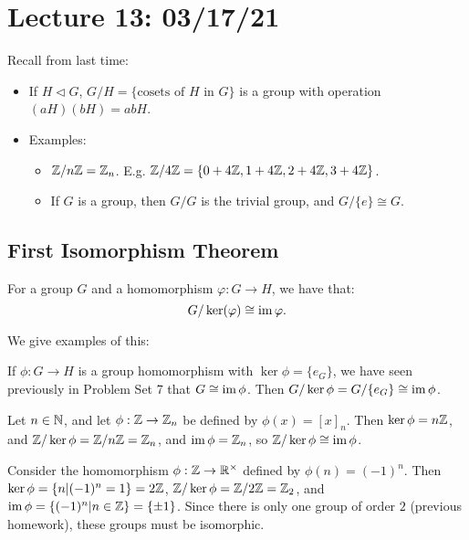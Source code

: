 \section{Lecture 13: 03/17/21}

Recall from last time:
\begin{itemize}
    \item If $H \triangleleft G$, $G/H = \{\text{cosets of $H$ in $G$}\}$ is a group with operation $(aH)(bH) = abH$.
    \item Examples:
    \begin{itemize}
        \item $\mathbb{Z}/n\mathbb{Z} = \mathbb{Z}_n$. E.g. $\mathbb{Z}/4\mathbb{Z} = \{0 + 4\mathbb{Z}, 1 + 4 \mathbb{Z}, 2 + 4\mathbb{Z}, 3 + 4\mathbb{Z}\}$.
        \item If $G$ is a group, then $G/G$ is the trivial group, and $G/\{e\} \cong G$.
    \end{itemize}
\end{itemize}

\subsection{First Isomorphism Theorem}

\begin{theorem}
For a group $G$ and a homomorphism $\varphi: G \to H$, we have that:
\[
G/\ker (\varphi) \cong \operatorname{im} \varphi.
\]
\end{theorem}

We give examples of this:

\begin{example}
If $\phi: G \to H$ is a group homomorphism with $\ker \phi = \{e_G\}$, we have seen previously in Problem Set 7 that $G \cong \operatorname{im} \phi$. Then $G/\ker\phi = G /\{e_G\} \cong \operatorname{im} \phi$.
\end{example}

\begin{example}
Let $n \in \mathbb{N}$, and let $\phi : \mathbb{Z} \to \mathbb{Z}_n$ be defined by $\phi(x) = [x]_n$. Then $\ker \phi = n\mathbb{Z}$, and $\mathbb{Z}/\ker\phi = \mathbb{Z}/n\mathbb{Z} = \mathbb{Z}_n$, and $\operatorname{im} \phi = \mathbb{Z}_n$, so $\mathbb{Z}/\ker\phi \cong \operatorname{im} \phi$.
\end{example}

\begin{example}
Consider the homomorphism $\phi : \mathbb{Z} \to \mathbb{R}^\times$ defined by $\phi (n) = (-1)^n$. Then $\ker \phi = \{n | (-1)^n = 1\} = 2\mathbb{Z}$, $\mathbb{Z}/\ker\phi = \mathbb{Z}/2\mathbb{Z} = \mathbb{Z}_2$, and $\operatorname{im} \phi = \{(-1)^n | n \in \mathbb{Z}\} = \{\pm 1\}$. Since there is only one group of order $2$ (previous homework), these groups must be isomorphic.
\end{example}

